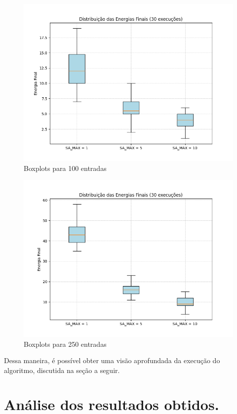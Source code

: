 \documentclass[12pt]{article}
\begin{document}
\begin{figure}[H]
  \centering
  \includegraphics[width=.9\textwidth]{imgs/boxplot_100.png}
  \caption{Boxplots para 100 entradas}
  \label{fig:boxplot100}
   \end{figure}

\begin{figure}[H]
  \centering
  \includegraphics[width=.9\textwidth]{imgs/boxplot_250.png}
  \caption{Boxplots para 250 entradas}
  \label{fig:boxplot250}
  \end{figure}

Dessa maneira, é possível obter uma visão aprofundada da execução do algoritmo, discutida na seção a seguir.

\section{Análise dos resultados obtidos.}
\label{sec:analise_dos_resultados_obtidos}
\end{document}
